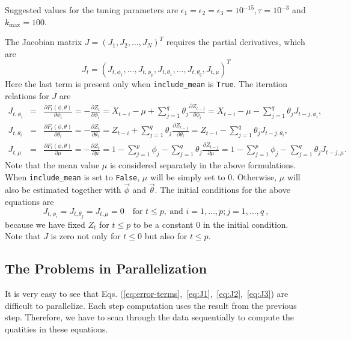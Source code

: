 \documentclass[english,12pt]{article}
\begin{document}
Suggested values for the tuning parameters are $\epsilon_1 = \epsilon_2 =
\epsilon_3 = 10^{-15}, \tau = 10^{-3}$ and $k_{\max} = 100$.

The Jacobian matrix $J = {(J_{1}, J_{2}, \ldots, J_N)}^T$ requires the partial derivatives, which are
\begin{equation}
J_t = {(J_{t, \phi_1}, \ldots, J_{t,\phi_p}, J_{t,\theta_1}, \ldots,
  J_{t,\theta_q}, J_{t,\mu})}^T
\end{equation}
Here the last term is present only when \texttt{include\_mean} is
\texttt{True}.
The iteration relations for $J$ are
\begin{eqnarray}
J_{t, \phi_i} &=& \frac{\partial F_t(\phi,\theta)}{\partial \phi_i} =
-\frac{\partial Z_t}{\partial \phi_i} = X_{t-i}-\mu + \sum_{j=1}^q
\theta_j \frac{\partial Z_{t - j}}{\partial \phi_i} = X_{t-i}-\mu - \sum_{j=1}^q
\theta_j J_{t-j,\phi_i}, \label{eq:J1}\\
J_{t, \theta_i}&=&\frac{\partial F_t(\phi,\theta)}{\partial \theta_i} =
-\frac{\partial Z_t}{\partial \theta_i} = Z_{t-i} + \sum_{j =1}^q
\theta_j \frac{\partial Z_{t - j}}{\partial \theta_i} = Z_{t-i} -
\sum_{j=1}^q \theta_j J_{t-j,\theta_i}, \label{eq:J2}\\
J_{t, \mu} &=&\frac{\partial F_t(\phi,\theta)}{\partial \mu} =
-\frac{\partial Z_t}{\partial \mu} = 1 -
\sum_{j=1}^p \phi_j - \sum_{j=1}^q \theta_j \frac{\partial
  Z_{t-j}}{\partial \mu} = 1 - \sum_{j=1}^p \phi_j - \sum_{j=1}^q
\theta_j J_{t-j,\mu}. \label{eq:J3}
\end{eqnarray}
Note that the mean value $\mu$ is considered separately in the above
formulations. When \texttt{include\_mean} is set to \texttt{False}, $\mu$ will be simply
set to 0. Otherwise, $\mu$ will also be estimated together with
$\vec{\phi}$ and $\vec{\theta}$. The initial conditions for the above
equations are
\begin{equation}
J_{t,\phi_i} = J_{t,\theta_j} = J_{t,\mu} = 0 \quad \mbox{for }
t \leq p,\ \mbox{and }i=1,\dots,p; j = 1, \dots, q\ ,
\end{equation}
because we have fixed $Z_t$ for $t\leq p$ to be a constant $0$ in the initial
condition. Note that $J$ is zero not only for $t\leq
0$ but also for $t\leq p$.

\subsection{The Problems in Parallelization}

It is very easy to see that Eqs.
(\ref{eq:error-terms},~\ref{eq:J1},~\ref{eq:J2},~\ref{eq:J3}) are
difficult to parallelize. Each step computation uses the result from the
previous step. Therefore, we have to scan through the data sequentially to
compute the quatities in these equations.
\end{document}

